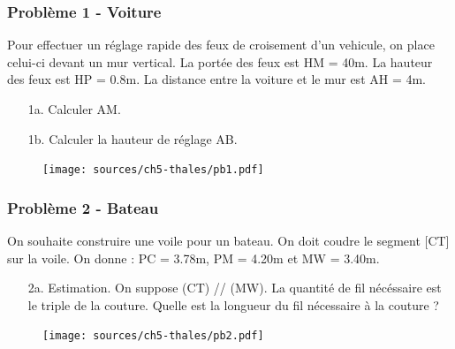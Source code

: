 \documentclass[11pt]{article}
\begin{document}
\begin{multicols}{2}

\subsubsection*{Problème 1 - Voiture}

Pour effectuer un réglage rapide des feux de croisement d'un vehicule, on place celui-ci devant un mur vertical. La portée des feux est HM = 40m. La hauteur des feux est HP = 0.8m. La distance entre la voiture et le mur est AH = 4m.

\begin{enumerate}
  \item[1a.] Calculer AM.
  \item[1b.] Calculer la hauteur de réglage AB.
\end{enumerate}

\begin{figure}[H]
  \centering
  \texttt{[image: sources/ch5-thales/pb1.pdf]}
\end{figure}

\end{multicols}

\begin{multicols}{2}

\subsubsection*{Problème 2 - Bateau}

On souhaite construire une voile pour un bateau. On doit coudre le segment [CT] sur la voile. On donne : PC = 3.78m, PM = 4.20m et MW = 3.40m.

\begin{enumerate}
  \item[2a.] Estimation. On suppose (CT) // (MW). La quantité de fil nécéssaire est le triple de la couture. Quelle est la longueur du fil nécessaire à la couture ?
\end{enumerate}

\begin{figure}[H]
  \centering
  \texttt{[image: sources/ch5-thales/pb2.pdf]}
\end{figure}

\end{multicols}
\end{document}
